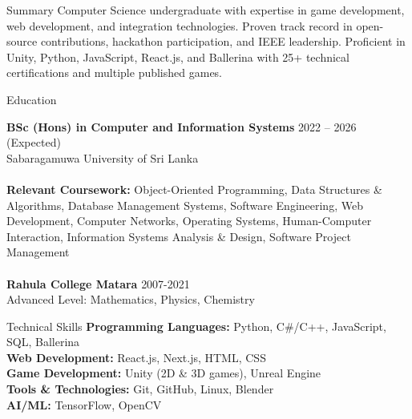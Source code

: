 \documentclass{resume} %
\begin{document}

\begin{rSection}{Summary}
Computer Science undergraduate with expertise in game development, web development, and integration technologies. Proven track record in open-source contributions, hackathon participation, and IEEE leadership. Proficient in Unity, Python, JavaScript, React.js, and Ballerina with 25+ technical certifications and multiple published games.
\end{rSection}


\begin{rSection}{Education}

{\bf BSc (Hons) in Computer and Information Systems} \hfill {2022 -- 2026 (Expected)}\\ 
Sabaragamuwa University of Sri Lanka \\ \\
\textbf{Relevant Coursework:} Object-Oriented Programming, Data Structures \& Algorithms, Database Management Systems, Software Engineering, Web Development, Computer Networks, Operating Systems, Human-Computer Interaction, Information Systems Analysis \& Design, Software Project Management \\ \\
{\bf Rahula College Matara} \hfill {2007-2021}\\ 
Advanced Level: Mathematics, Physics, Chemistry

\end{rSection}

\begin{rSection}{Technical Skills}
\textbf{Programming Languages:} Python, C\#/C++, JavaScript, SQL, Ballerina\\
\textbf{Web Development:} React.js, Next.js, HTML, CSS \\
\textbf{Game Development:} Unity (2D \& 3D games), Unreal Engine \\
\textbf{Tools \& Technologies:} Git, GitHub, Linux, Blender \\
\textbf{AI/ML:} TensorFlow, OpenCV \\
\end{rSection}
\end{document}
